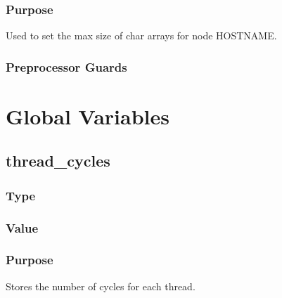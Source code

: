 \documentclass[letterpaper,10pt,english]{sphinxmanual}
\begin{document}
\subsection{Purpose}
\label{\detokenize{definitions/definitions:id28}}
\sphinxAtStartPar
Used to set the max size of char arrays for node HOSTNAME.


\subsection{Preprocessor Guards}
\label{\detokenize{definitions/definitions:id29}}
\sphinxAtStartPar
{}

\sphinxstepscope


\chapter{Global Variables}
\label{\detokenize{global_vars/global_vars:global-variables}}\label{\detokenize{global_vars/global_vars::doc}}

\section{thread\_cycles}
\label{\detokenize{global_vars/global_vars:thread-cycles}}\label{\detokenize{global_vars/global_vars:id1}}

\subsection{Type}
\label{\detokenize{global_vars/global_vars:type}}
\sphinxAtStartPar
{}


\subsection{Value}
\label{\detokenize{global_vars/global_vars:value}}
\sphinxAtStartPar
{}


\subsection{Purpose}
\label{\detokenize{global_vars/global_vars:purpose}}
\sphinxAtStartPar
Stores the number of cycles for each thread.
\end{document}
